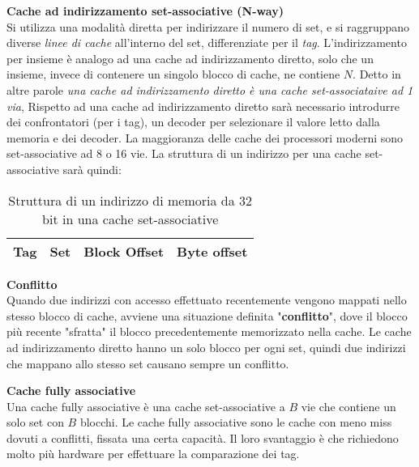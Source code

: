 \begin{defn}
    \textbf{Cache ad indirizzamento set-associative (N-way)} \\
    Si utilizza una modalità diretta per indirizzare il numero di set, e si
    raggruppano diverse \textit{linee di cache} all'interno del set,
    differenziate per il \textit{tag}. L'indirizzamento per insieme è analogo ad
    una cache ad indirizzamento diretto, solo che un insieme, invece di
    contenere un singolo blocco di cache, ne contiene $N$. Detto in altre parole
    \textit{una cache ad indirizzamento diretto è una cache set-associataive ad
    1 via},  Rispetto ad una cache ad indirizzamento diretto sarà necessario
    introdurre dei confrontatori (per i tag), un decoder per selezionare il
    valore letto dalla memoria e dei decoder. La maggioranza delle cache dei
    processori moderni sono set-associative ad 8 o 16 vie. La struttura di un
    indirizzo per una cache set-associative sarà quindi:
    \begin{table}[htbp]
        \centering
        \caption{Struttura di un indirizzo di memoria da 32 bit in una cache set-associative}
        \label{tab:addr-setassoc}
        \begin{tabular}{|l|l|l|l|}
        \hline
        Tag & Set & Block Offset & Byte offset \\ \hline
        \end{tabular}
    \end{table}
\end{defn}

\begin{defn}
    \textbf{Conflitto} \\
    Quando due indirizzi con accesso effettuato recentemente vengono mappati
    nello stesso blocco di cache, avviene una situazione definita
    "\textbf{conflitto}", dove il blocco più recente "sfratta" il blocco
    precedentemente memorizzato nella cache. Le cache ad indirizzamento diretto
    hanno un solo blocco per ogni set, quindi due indirizzi che mappano allo
    stesso set causano sempre un conflitto.
\end{defn}


\begin{defn}
    \textbf{Cache fully associative} \\
    Una cache fully associative è una cache set-associative a $B$ vie che
    contiene un solo set con $B$ blocchi. Le cache fully associative sono le
    cache con meno miss dovuti a conflitti, fissata una certa capacità. Il loro
    svantaggio è che richiedono molto più hardware per effettuare la
    comparazione dei tag.
\end{defn}


